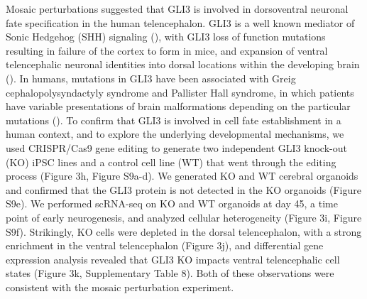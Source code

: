 Mosaic perturbations suggested that GLI3 is involved in dorsoventral neuronal fate specification in the human telencephalon. GLI3 is a well known mediator of Sonic Hedgehog (SHH) signaling (\cite{ruiz_i_altaba_hedgehoggli_2002}), with GLI3 loss of function mutations resulting in failure of the cortex to form in mice, and expansion of ventral telencephalic neuronal identities into dorsal locations within the developing brain (\cite{rallu_dorsoventral_2002,theil_gli3_1999}). In humans, mutations in GLI3 have been associated with Greig cephalopolysyndactyly syndrome and Pallister Hall syndrome, in which patients have variable presentations of brain malformations depending on the particular mutations (\cite{biesecker_greig_2008}). To confirm that GLI3 is involved in cell fate establishment in a human context, and to explore the underlying developmental mechanisms, we used CRISPR/Cas9 gene editing to generate two independent GLI3 knock-out (KO) iPSC lines  and a control cell line (WT) that went through the editing process (Figure 3h, Figure S9a-d). We generated KO and WT cerebral organoids and confirmed that the GLI3 protein is not detected in the KO organoids (Figure S9e). We performed scRNA-seq on KO and WT organoids at day 45, a time point of early neurogenesis, and analyzed cellular heterogeneity (Figure 3i, Figure S9f). Strikingly, KO cells were depleted in the dorsal telencephalon, with a strong enrichment in the ventral telencephalon (Figure 3j), and differential gene expression analysis revealed that GLI3 KO impacts ventral telencephalic cell states (Figure 3k, Supplementary Table 8). Both of these observations were consistent with the mosaic perturbation experiment.


